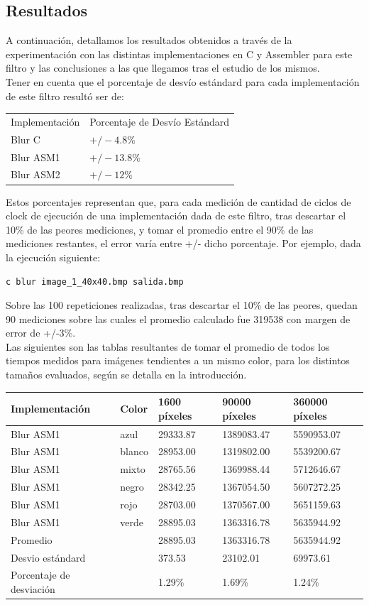 \subsection{Resultados}
A continuación, detallamos los resultados obtenidos a través de la experimentación con las distintas implementaciones en C y Assembler para este filtro y las conclusiones a las que llegamos tras el estudio de los mismos.\\
Tener en cuenta que el porcentaje de desvío estándard para cada implementación de este filtro resultó ser de:
\begin{tabular}{| l | l |}
\hline
Implementación & Porcentaje de Desvío Estándard \\
Blur C  & $+/- 4.8\%$\\
Blur ASM1 &   $+/- 13.8\%$\\
Blur ASM2 & $+/- 12\%$\\
\hline
\end{tabular}

Estos porcentajes representan que, para cada medición de cantidad de ciclos de clock de ejecución de una implementación dada de este filtro, tras descartar el 10\% de las peores mediciones, y tomar el promedio entre el 90\% de las mediciones restantes, el error varía entre +/- dicho porcentaje. Por ejemplo, dada la ejecución siguiente:\\

\begin{verbatim}
c blur image_1_40x40.bmp salida.bmp
\end{verbatim}
Sobre las 100 repeticiones realizadas, tras descartar el 10\% de las peores, quedan 90 mediciones sobre las cuales el promedio calculado fue 319538 con margen de error de +/-3\%.\\
Las siguientes son las tablas resultantes de tomar el promedio de todos los tiempos medidos para imágenes tendientes a un mismo color, para los distintos tamaños evaluados, según se detalla en la introducción.\\

\begin{tabular}{| l | l | l | l | l |}
\hline
Implementación & Color & 1600 píxeles & 90000 píxeles & 360000 píxeles\\
\hline
Blur ASM1 & azul & 29333.87 & 1389083.47&  5590953.07\\ 
\hline
Blur ASM1 & blanco & 28953.00&  1319802.00 & 5539200.67\\ 
\hline
Blur ASM1 & mixto & 28765.56  &1369988.44  & 5712646.67\\ 
\hline
Blur ASM1 & negro & 28342.25  &1367054.50  & 5607272.25\\
\hline
Blur ASM1 & rojo & 28703.00  &1370567.00  & 5651159.63\\
\hline
Blur ASM1 & verde & 28895.03  &1363316.78  & 5635944.92\\ 
\hline
Promedio & &  28895.03  &1363316.78 & 5635944.92\\
\hline
Desvio estándard  && 373.53  &23102.01 &  69973.61\\
\hline
Porcentaje de desviación  && 1.29\%& 1.69\%& 1.24\%\\
\hline
\end{tabular}

